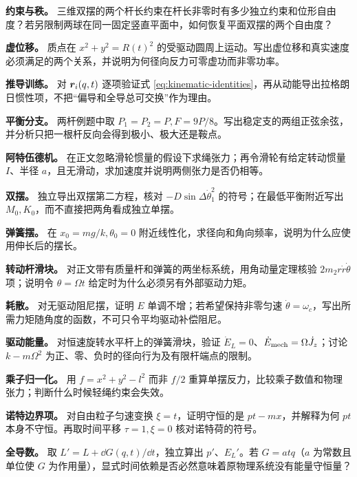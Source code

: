 \begin{bookexercises}
\item {} \textbf{约束与秩。} 三维双摆的两个杆长约束在杆长非零时有多少独立约束和位形自由度？若另限制两球在同一固定竖直平面中，如何恢复平面双摆的两个自由度？
\item {} \textbf{虚位移。} 质点在 $x^2+y^2=R(t)^2$ 的受驱动圆周上运动。写出虚位移和真实速度必须满足的两个关系，并说明为何径向反力可零虚功而非零功率。
\item {} \textbf{推导训练。} 对 $\boldsymbol{r}_i(q,t)$ 逐项验证式 \eqref{eq:kinematic-identities}，再从动能导出拉格朗日惯性项，不把“偏导和全导总可交换”作为理由。
\item {} \textbf{平衡分支。} 两杆例题中取 $P_1=P_2=P,F=9P/8$。写出稳定支的两组正弦余弦，并分析只把一根杆反向会得到极小、极大还是鞍点。
\item {} \textbf{阿特伍德机。} 在正文忽略滑轮惯量的假设下求绳张力；再令滑轮有给定转动惯量 $I$、半径 $a$，且无滑动，求加速度并说明两侧张力是否仍相等。
\item {} \textbf{双摆。} 独立导出双摆第二方程，核对 $-D\sin\Delta\dot\theta_1^2$ 的符号；在最低平衡附近写出 $M_0,K_0$，而不直接把两角看成独立单摆。
\item {} \textbf{弹簧摆。} 在 $x_0=mg/k,\theta_0=0$ 附近线性化，求径向和角向频率，说明为什么应使用伸长后的摆长。
\item {} \textbf{转动杆滑块。} 对正文带有质量杆和弹簧的两坐标系统，用角动量定理核验 $2m_2r\dot r\dot\theta$ 项；说明令 $\theta=\Omega t$ 给定时为什么必须另有外部驱动力矩。
\item {} \textbf{耗散。} 对无驱动阻尼摆，证明 $E$ 单调不增；若希望保持非零匀速 $\dot\theta=\omega_c$，写出所需力矩随角度的函数，不可只令平均驱动补偿阻尼。
\item {} \textbf{驱动能量。} 对恒速旋转水平杆上的弹簧滑块，验证 $\dot E_L=0$、$\dot E_{\rm mech}=\Omega\dot J_z$；讨论 $k-m\Omega^2$ 为正、零、负时的径向行为及有限杆端点的限制。
\item {} \textbf{乘子归一化。} 用 $f=x^2+y^2-l^2$ 而非 $f/2$ 重算单摆反力，比较乘子数值和物理张力；判断什么时候轻绳约束会失效。
\item {} \textbf{诺特边界项。} 对自由粒子匀速变换 $\xi=t$，证明守恒的是 $pt-mx$，并解释为何 $pt$ 本身不守恒。再取时间平移 $\tau=1,\xi=0$ 核对诺特荷的符号。
\item {} \textbf{全导数。} 取 $L'=L+\dd G(q,t)/\dd t$，独立算出 $p'$、$E_L'$。若 $G=atq$（$a$ 为常数且单位使 $G$ 为作用量），显式时间依赖是否必然意味着原物理系统没有能量守恒量？

\end{bookexercises}
